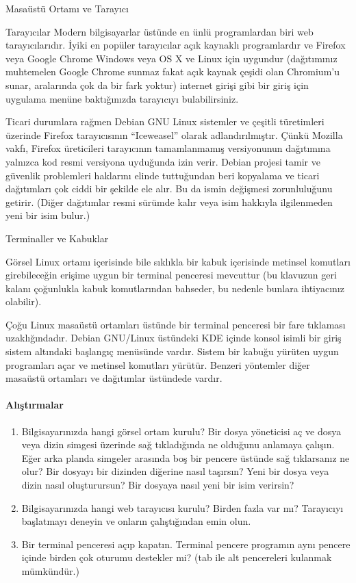\begin{section}{Masaüstü Ortamı ve Tarayıcı}
\begin{subsection}{Tarayıcılar}
Modern bilgisayarlar üstünde en ünlü programlardan biri web tarayıcılarıdır. İyiki en popüler tarayıcılar açık kaynaklı programlardır ve Firefox veya Google Chrome Windows veya OS X ve Linux için uygundur (dağıtımınız muhtemelen Google Chrome sunmaz fakat açık kaynak çeşidi olan Chromium’u sunar, aralarında çok da bir fark yoktur) internet girişi gibi bir giriş için uygulama menüne baktığınızda tarayıcıyı bulabilirsiniz.

Ticari durumlara rağmen Debian GNU Linux sistemler ve çeşitli türetimleri üzerinde Firefox tarayıcısının  “Iceweasel” olarak adlandırılmıştır. Çünkü Mozilla vakfı, Firefox üreticileri tarayıcının tamamlanmamış versiyonunun dağıtımına yalnızca kod resmi versiyona  uyduğunda izin verir. Debian projesi tamir ve güvenlik problemleri haklarını elinde tuttuğundan beri kopyalama ve ticari dağıtımları çok ciddi bir şekilde ele alır. Bu da ismin değişmesi zorunluluğunu getirir. (Diğer dağıtımlar resmi sürümde kalır veya isim hakkıyla ilgilenmeden yeni bir isim bulur.) 
\end{subsection}
\begin{subsection}{Terminaller ve Kabuklar}
\label{sec:bolum323}

Görsel Linux ortamı içerisinde bile sıklıkla bir kabuk içerisinde metinsel komutları girebileceğin erişime uygun bir terminal penceresi mevcuttur (bu klavuzun geri kalanı çoğunlukla kabuk komutlarından bahseder, bu nedenle bunlara ihtiyacınız olabilir).

Çoğu Linux masaüstü ortamları üstünde bir terminal penceresi bir fare tıklaması uzaklığındadır. Debian GNU/Linux üstündeki KDE içinde konsol isimli bir giriş sistem altındaki başlangıç menüsünde vardır. Sistem bir kabuğu yürüten uygun programları açar ve metinsel komutları yürütür. Benzeri yöntemler diğer masaüstü ortamları ve dağıtımlar üstündede vardır.
\end{subsection}

\paragraph{{\Huge{\PencilLeftDown}}Alıştırmalar}{
\begin{enumerate}
 \item Bilgisayarınızda hangi görsel ortam kurulu? Bir dosya yöneticisi aç ve dosya veya dizin simgesi üzerinde sağ tıkladığında ne olduğunu anlamaya çalışın. Eğer arka planda simgeler arasında boş bir pencere üstünde sağ tıklarsanız ne olur? Bir dosyayı bir dizinden diğerine nasıl taşırsın? Yeni bir dosya veya dizin nasıl oluşturursun? Bir dosyaya nasıl yeni bir isim verirsin?
 \item Bilgisayarınızda hangi web tarayıcısı kurulu? Birden fazla var mı? Tarayıcıyı başlatmayı deneyin ve onların çalıştığından emin olun.
 \item Bir terminal penceresi açıp kapatın. Terminal pencere programın aynı pencere içinde birden çok oturumu destekler mi? (tab ile alt pencereleri kulanmak mümkündür.)
\end{enumerate}}
\end{section}
